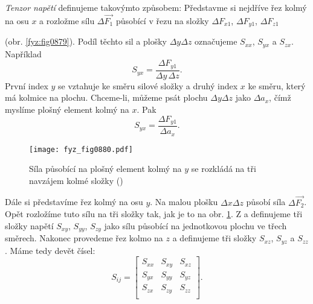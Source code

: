     \emph{Tenzor napětí} definujeme takovýmto způsobem: Představme si nejdříve řez kolmý na osu
    \(x\) a rozložme sílu \(Δ\vec{F_1}\) působící v řezu na složky \(ΔF_{x1}\), \(ΔF_{y1}\),
    \(ΔF_{z1}\){ (obr. \ref{fyz:fig0879}). Podíl těchto sil a plošky \(\Delta y\Delta z\) označujeme
    \(S_{xx}\), \(S_{yx}\) a \(S_{zx}\). Například
    \begin{equation*}
      S_{yx}=\frac{\Delta F_{y1}}{\Delta y\,\Delta z}.
    \end{equation*}
    První index \(y\) se vztahuje ke směru silové složky a druhý index \(x\) ke směru, který má
    kolmice na plochu. Chceme-li, můžeme psát plochu \(\Delta y\Delta z\) jako \(\Delta a_x\), čímž
    myslíme plošný element kolmý na \(x\). Pak
    \begin{equation*}
      S_{yx}=\frac{\Delta F_{y1}}{\Delta a_x}.
    \end{equation*}

    \begin{figure}[ht!] %
      \centering
      \texttt{[image: fyz\_fig0880.pdf]}
      \caption{Síla působící na plošný element kolmý na \(y\) se rozkládá na tři navzájem kolmé
               složky (\cite[s.~584]{Feynman02})}
      \label{fyz:fig0880}
    \end{figure}

    Dále si představíme řez kolmý na osu \(y\). Na malou plošku \(\Delta x \Delta z\) působí síla
    \(Δ\vec{F_2}\). Opět rozložíme tuto sílu na tři složky tak, jak je to na obr. \ref{fyz:fig0880}.
    Z a definujeme tři složky napětí \(S_{xy}\), \(S_{yy}\), \(S_{zy}\) jako sílu působící na
    jednotkovou plochu ve třech směrech. Nakonec provedeme řez kolmo na \(z\) a definujeme tři
    složky \(S_{xz}\), \(S_{yz}\) a \(S_{zz}\). Máme tedy devět čísel:
    \begin{equation}\label{fyz:eq951}
      S_{ij}=
        \begin{bmatrix}
          S_{xx} & S_{xy} & S_{xz}  \\
          S_{yx} & S_{yy} & S_{yz}  \\
          S_{zx} & S_{zy} & S_{zz}  \\
        \end{bmatrix}.
    \end{equation}

}
